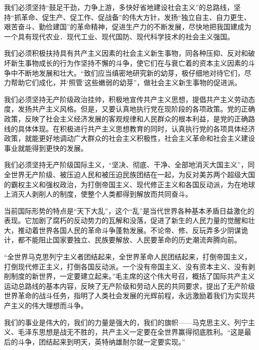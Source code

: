 \documentclass{book}
\begin{document}
我们必须坚持“鼓足干劲，力争上游，多快好省地建设社会主义”的总路线，坚持“抓革命、促生产、促工作、促战备”的伟大方针，发扬“独立自主、自力更生、艰苦奋斗、勤俭建国”的革命精神，促进生产力的不断发展，尽快地把我国建成为一个具有现代农业．现代工业、现代国防、现代科学技术的社会主义强国。

我们必须积极扶持具有共产主义因素的社会主义新生事物，同各种压抑、反对和破坏新生事物成长的行为作坚持不懈的斗争，使它们在与衰亡着的资本主义因素的斗争中不断地发展和壮大。“致们应当缜密地研究新的幼芽，极仔细地对待它们，尽力帮助它们成化，并‘照管’这些嫩弱的幼芽”，做社会主义新生事物的促进派。

我们必须坚持无产阶级政治挂帅，积极地宣传共产主义思想，提倡共产主义劳动态度，发扬共产主义风格。但是，又要认真地执行党在现阶段的各项政策。党的正确政策，反映了社会主义经济发展的客观规律和人民群众的根本利益，是党的正确路线的具体体现。在积极进行共产主义思想教育的同时，认真执行党的各项具体经济政策，就能更好地调动广大群众的社会主义积极性，社会主义革命和社会主义建设事业就能得到更快的发展。

我们必须坚持无产阶级国际主义，“坚决、彻底、干净、全部地消灭大国主义”，同全世界无产阶级、被压迫人民和被压迫民族团结在一起，为反对美苏两个超级大国的霸权主义和强权政治，为打倒帝国主义、现代修正主义和各国反动派，为在地球上消灭人剥削人的制度，使整个人类都得到解放而共同奋斗。

当前国际形势的特点是“天下大乱”，这个“乱”是当代世界各种基本矛盾日益激化的表现。它加剧了腐朽的反动势力的瓦解和没落，促进了新生的人民力量的觉醒和壮大，推动着世界各国人民的革命斗争蓬勃发展。不论帝、修、反玩弄多少阴谋诡计，都不能阻止国家要独立、民族要解放、人民要革命的历史潮流奔腾向前。

“全世界马克思列宁主义者团结起来，全世界革命人民团结起来，打倒帝国主义，打倒现代修正主义，打倒各国反动派。一个没有帝国主义、没有资本主义、没有剥削制度的新世界，一定要建立起来。”毛主席的这个伟大号召，概括了国际共产主义运动总路线的基本内容，反映了无产阶级和劳动人民的共同要求，提出了无产阶级世界革命的战斗任务，指明了人类社会发展的光辉前程，永远激励着我们为实现共产主义的伟大理想而斗争。

我们的事业是伟大的，我们的力量是强大的，我们的旗帜——马克思主义、列宁主义、毛泽东思想是战无不胜的，共产主义一定要在全世界赢得彻底胜利。“这是最后的斗争，团结起来到明天，英特纳雄耐尔就一定要实现。”
\end{document}
